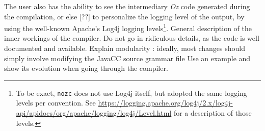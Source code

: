 The user also has the ability to see the intermediary \textit{Oz} code generated during the compilation, or else [??] to personalize the logging level of the output, by using the well-known Apache's Log4j logging levels\footnote{To be exact, \texttt{nozc} does not use Log4j itself, but adopted the same logging levels per convention. See \url{https://logging.apache.org/log4j/2.x/log4j-api/apidocs/org/apache/logging/log4j/Level.html} for a description of those levels.}.
\newline\newline
General description of the inner workings of the compiler.
Do not go in ridiculous details, as the code is well documented and available.
Explain modularity : ideally, most changes should simply involve modifying the JavaCC source grammar file
Use an example and show its evolution when going through the compiler.

